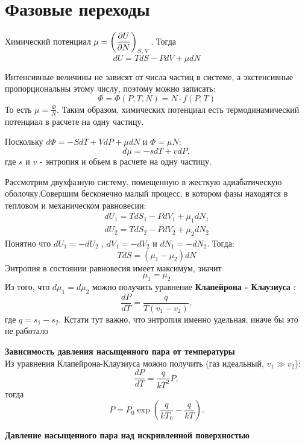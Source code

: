 \section{Фазовые переходы}
Химический потенциал $\mu = \left(\dfrac{\partial {U}}{\partial {N}} \right)_{S,\, V}$. Тогда
$$d U = T d S - P d V + \mu d N$$

Интенсивные величины не зависят от числа частиц в системе, а экстенсивные пропорциональны этому числу, поэтому можно записать:
$$ \Phi = \Phi (P, T, N) = N \cdot f(P,T) $$
То есть $\mu = \frac{\Phi}{N}$. Таким образом, химических потенциал есть термодинамический потенциал в расчете на одну частицу.

Поскольку $d \Phi = - S d T + V d P + \mu d N $ и $\Phi = \mu N $:
$$d \mu = - s d T + v d P,$$
где $s$ и $v$ -  энтропия и обьем в расчете на одну частицу.

Рассмотрим двухфазную систему, помещенную в жесткую адиабатическую оболочку.Совершим бесконечно малый процесс, в котором фазы находятся в тепловом и механическом равновесии:
\begin{align*}
    d U_1 = T d S_1 - P d V_1 + \mu_1 d N_1 \\
    d U_2 = T d S_2 - P d V_2 + \mu_2 d N_2
\end{align*}
Понятно что $d U_1 = -d U_2$ , $d V_1 = -d V_2$ и $d N_1 = -d N_2.$
Тогда:
$$T d S = (\mu_1 - \mu_2) d N$$
Энтропия в состоянии равновесия имеет максимум, значит 
$$\mu_1 = \mu_2$$
Из того, что $d \mu_1 = d \mu_2$ можно получить уравнение \textbf{Клапейрона - Клаузиуса} :
\begin{equation} \boxed{
\frac{d P}{d T}= \frac{q}{ T (v_1 - v_2)}
}, \end{equation}
где $ q = s_1 - s_2$. Кстати тут важно, что энтропия именно удельная, иначе бы это не работало 

\phantom{42}

\noindent
\textbf{Зависимоcть давления насыщенного пара от температуры}\\
Из уравнения Клапейрона-Клаузиуса можно получить (газ идеальный, $ v_1 \gg v_2$):
$$\frac{d P}{d T}= \frac{q}{ k T^2} P,$$ тогда
\begin{equation}
P = P_0 \exp\left(\frac{q}{k T_0} - \frac{q}{k T}\right).
\end{equation}

\phantom{42}

\noindent
\textbf{Давление насыщенного пара над искривленной поверхностью}

